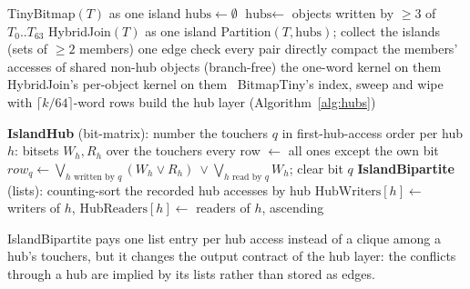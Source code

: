 \documentclass[10pt,a4paper]{article}
\newcommand{\W}{\mathit{W}}
\newcommand{\R}{\mathit{R}}
\begin{document}
\begin{algorithm}[H]
\caption{IslandHub$(T)$ / IslandBipartite$(T)$}
\begin{algorithmic}[1]
\If{$n \le 64$ \textbf{and} $\sum_t(|\W(t)|+|\R(t)|) - \#\text{objects} \ge \lceil 0.5\,n\rceil$}
  \State \Return TinyBitmap$(T)$ as one island 
\EndIf
\State $\text{hubs} \gets \emptyset$
  \State $\text{hubs} \gets$ objects written by $\ge 3$ of $T_0..T_{63}$ 
    \State \Return HybridJoin$(T)$ as one island 
  \EndIf
\EndIf
\State Partition$(T, \text{hubs})$; collect the islands (sets of $\ge 2$ members)
 
   one edge 
   check every pair directly
  \Else
    \State compact the members' accesses of shared non-hub objects (branch-free)
     the one-word kernel on them 
     HybridJoin's per-object kernel on them 
    \Else\ BitmapTiny's index, sweep and wipe with $\lceil k/64\rceil$-word rows
    \EndIf
  \EndIf
\EndFor
\State build the hub layer (Algorithm~\ref{alg:hubs})
\end{algorithmic}
\end{algorithm}

\begin{algorithm}[H]
\caption{The two hub layers}\label{alg:hubs}
\begin{algorithmic}[1]
\Statex \textbf{IslandHub} (bit-matrix): number the touchers $q$ in first-hub-access order
\State per hub $h$: bitsets $W_h, R_h$ over the touchers
 
  \State every row $\gets$ all ones except the own bit
\Else
   $row_q \gets \bigvee_{h \text{ written by } q}(W_h\lor R_h)\ \lor \bigvee_{h \text{ read by } q} W_h$; clear bit $q$ \EndFor
\EndIf
\Statex \textbf{IslandBipartite} (lists): counting-sort the recorded hub accesses by hub
\State $\text{HubWriters}[h] \gets$ writers of $h$, $\text{HubReaders}[h] \gets$ readers of $h$, ascending
\end{algorithmic}
\end{algorithm}

IslandBipartite pays one list entry per hub access instead of a clique among a hub's touchers,
but it changes the output contract of the hub layer: the conflicts through a hub are implied by its
lists rather than stored as edges.
\end{document}
